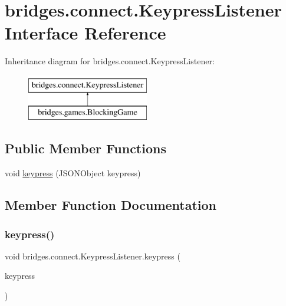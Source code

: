 \hypertarget{interfacebridges_1_1connect_1_1_keypress_listener}{}\section{bridges.\+connect.\+Keypress\+Listener Interface Reference}
\label{interfacebridges_1_1connect_1_1_keypress_listener}
Inheritance diagram for bridges.\+connect.\+Keypress\+Listener\+:\begin{figure}[H]
\begin{center}
\leavevmode
\includegraphics[height=2.000000cm]{interfacebridges_1_1connect_1_1_keypress_listener}
\end{center}
\end{figure}
\subsection*{Public Member Functions}
\begin{DoxyCompactItemize}
\item 
void \hyperlink{interfacebridges_1_1connect_1_1_keypress_listener_af713d94f36bce842f39ce0aea4db8da6}{keypress} (J\+S\+O\+N\+Object keypress)
\end{DoxyCompactItemize}


\subsection{Member Function Documentation}
\mbox{\label{interfacebridges_1_1connect_1_1_keypress_listener_af713d94f36bce842f39ce0aea4db8da6}} 
\subsubsection{\texorpdfstring{keypress()}{keypress()}}
{\footnotesize\ttfamily void bridges.\+connect.\+Keypress\+Listener.\+keypress (\begin{DoxyParamCaption}\item[{J\+S\+O\+N\+Object}]{keypress }\end{DoxyParamCaption})}



